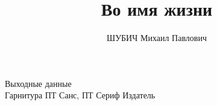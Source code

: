 ﻿\author{\large ШУБИЧ Михаил Павлович}
\title{\LARGE\bf Во имя жизни}
{Выходные данные
\\Гарнитура ПТ Санс, ПТ Сериф}
{Издатель}
\makelastpage